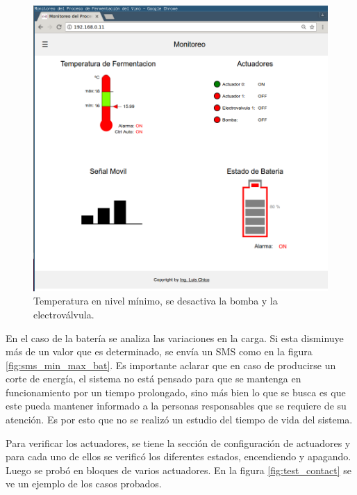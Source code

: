 \begin{figure}[h]
  \centering
  \includegraphics[scale=.3]{./Figures/auto_control_inactive.png}
  \caption{Temperatura en nivel mínimo, se desactiva la bomba y la electroválvula.}
  \label{fig:auto_control_inactive}
\end{figure}


En el caso de la batería se analiza las variaciones en la carga.
Si esta disminuye más de un valor que es determinado, se envía un SMS como en la figura \ref{fig:sms_min_max_bat}. 
Es importante aclarar que en caso de producirse un corte de energía, el sistema no está pensado para que se mantenga en funcionamiento por un tiempo prolongado, sino más bien lo que se busca es que este pueda mantener informado a la personas responsables que se requiere de su atención. 
Es por esto que no se realizó un estudio del tiempo de vida del sistema.

Para verificar los actuadores, se tiene la sección de configuración de actuadores y para cada uno de ellos se verificó los diferentes estados, encendiendo y apagando. Luego se probó en bloques de varios actuadores. En la figura \ref{fig:test_contact} se ve un ejemplo de los casos probados.

